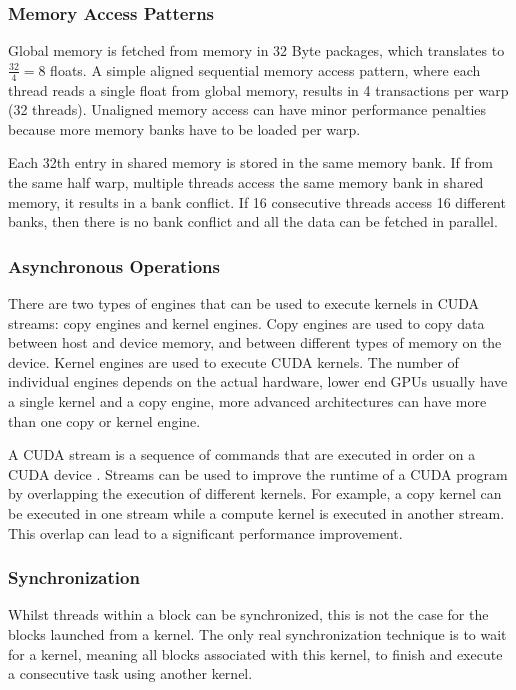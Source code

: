 \documentclass[]{article}
\begin{document}
\subsubsection{Memory Access Patterns}

Global memory is fetched from memory in 32 Byte packages, which translates to $\frac{32}{4} = 8$ floats. A simple aligned sequential memory access pattern, where each thread reads a single float from global memory, results in 4 transactions per warp (32 threads). Unaligned memory access can have minor performance penalties because more memory banks have to be loaded per warp. \cite{gMem}

Each 32th entry in shared memory is stored in the same memory bank. If from the same half warp, multiple threads access the same memory bank in shared memory, it results in a bank conflict. If 16 consecutive threads access 16 different banks, then there is no bank conflict and all the data can be fetched in parallel.


\subsubsection{Asynchronous Operations} \label{sec:async}

There are two types of engines that can be used to execute kernels in CUDA streams: copy engines and kernel engines. Copy engines are used to copy data between host and device memory, and between different types of memory on the device. Kernel engines are used to execute CUDA kernels. The number of individual engines depends on the actual hardware, lower end GPUs usually have a single kernel and a copy engine, more advanced architectures can have more than one copy or kernel engine.

A CUDA stream is a sequence of commands that are executed in order on a CUDA device \cite{streams}. Streams can be used to improve the runtime of a CUDA program by overlapping the execution of different kernels. For example, a copy kernel can be executed in one stream while a compute kernel is executed in another stream. This overlap can lead to a significant performance improvement.


\subsubsection{Synchronization}

Whilst threads within a block can be synchronized, this is not the case for the blocks launched from a kernel. The only real synchronization technique is to wait for a kernel, meaning all blocks associated with this kernel, to finish and execute a consecutive task using another kernel. 
\end{document}
